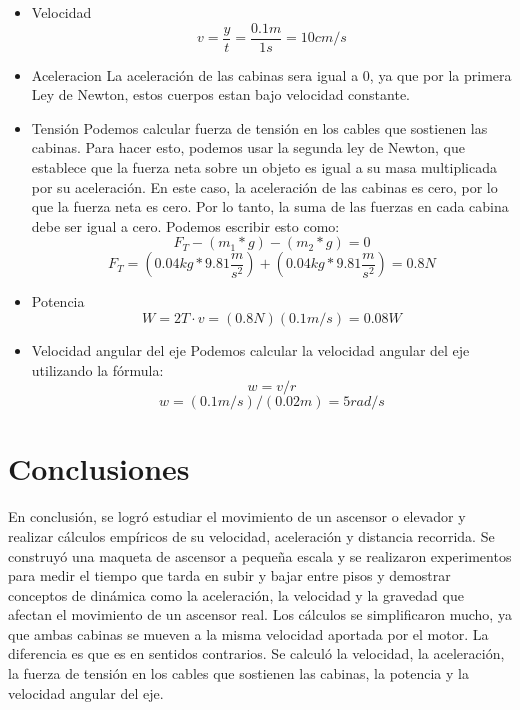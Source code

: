 \documentclass{article}
\begin{document}
    \begin{itemize}
        \item Velocidad
     \newline
        $$v=\frac{y}{t}=\frac{0.1m}{1s}=10cm/s$$
        \item Aceleracion
        \newline
        La aceleración de las cabinas sera igual a 0, ya que por la primera Ley de Newton, estos cuerpos
        estan bajo velocidad constante. 
        \item Tensión 
        \newline
        Podemos calcular fuerza de tensión en los cables que sostienen las cabinas. Para hacer esto, podemos usar la segunda ley de Newton, que establece que la fuerza neta sobre un objeto es igual a su masa multiplicada por su aceleración. En este caso, la aceleración de las cabinas es cero, por lo que la fuerza neta es cero. Por lo tanto, la suma de las fuerzas en cada cabina debe ser igual a cero. Podemos escribir esto como:
        \newline
       $$F_{T}-\left ( m_{1}*g \right )-\left ( m_{2}*g \right )=0$$
        $$F_{T}=\left ( 0.04kg*9.81\frac{m}{{s}^2} \right )+\left ( 0.04kg*9.81\frac{m}{{s}^2} \right )=0.8N$$
        \item Potencia
        $$W=2T\cdot v=\left ( 0.8N \right )\left ( 0.1m/s \right )=0.08W$$
        \item Velocidad angular del eje
        Podemos calcular la velocidad angular del eje utilizando la fórmula:
        \newline
        $$w = v/r$$
        $$w =\left ( 0.1m/s \right )/\left ( 0.02m \right )=5 rad/s$$
      \end{itemize}


    \section*{Conclusiones}
    En conclusión, se logró estudiar el movimiento de un ascensor o elevador y realizar cálculos empíricos de su velocidad, aceleración y distancia recorrida. Se construyó una maqueta de ascensor a pequeña escala y se realizaron experimentos para medir el tiempo que tarda en subir y bajar entre pisos y demostrar conceptos de dinámica como la aceleración, la velocidad y la gravedad que afectan el movimiento de un ascensor real. Los cálculos se simplificaron mucho, ya que ambas cabinas se mueven a la misma velocidad aportada por el motor. La diferencia es que es en sentidos contrarios. Se calculó la velocidad, la aceleración, la fuerza de tensión en los cables que sostienen las cabinas, la potencia y la velocidad angular del eje.
    
\end{document}
